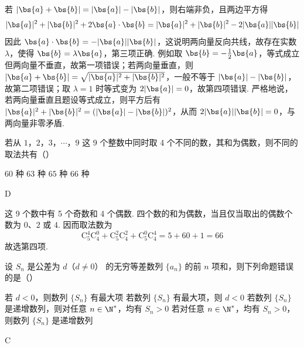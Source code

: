 \begin{solution}
若 \(|\bs{a}+\bs{b}|=|\bs{a}|-|\bs{b}|\)，则右端非负，且两边平方得
\[
|\bs{a}|^2+|\bs{b}|^2+2\bs{a}\cdot\bs{b}
=|\bs{a}|^2+|\bs{b}|^2-2|\bs{a}||\bs{b}|
\]
因此 \(\bs{a}\cdot\bs{b}=-|\bs{a}||\bs{b}|\)，这说明两向量反向共线，故存在实数 \(\lambda\)，使得 \(\bs{b}=\lambda\bs{a}\)，第三项正确. 例如取 \(\bs{b}=-\frac12\bs{a}\)，等式成立但两向量不垂直，故第一项错误；若两向量垂直，则 \(|\bs{a}+\bs{b}|=\sqrt{|\bs{a}|^2+|\bs{b}|^2}\)，一般不等于 \(|\bs{a}|-|\bs{b}|\)，故第二项错误；取 \(\lambda=1\) 时等式变为 \(2|\bs{a}|=0\)，故第四项错误.
严格地说，若两向量垂直且题设等式成立，则平方后有 \(|\bs{a}|^2+|\bs{b}|^2=(|\bs{a}|-|\bs{b}|)^2\)，从而 \(2|\bs{a}||\bs{b}|=0\)，与两向量非零矛盾.
\end{solution}

\begin{problem}
若从 \(1\)，\(2\)，\(3\)，\(\cdots\)，\(9\) 这 9 个整数中同时取 4 个不同的数，其和为偶数，则不同的取法共有（\quad）

\choices
    {\(60\text{ 种}\)}
    {\(63\text{ 种}\)}
    {\(65\text{ 种}\)}
    {\(66\text{ 种}\)}
\end{problem}

\begin{answer}
D
\end{answer}

\begin{solution}
这 9 个数中有 5 个奇数和 4 个偶数. 四个数的和为偶数，当且仅当取出的偶数个数为 \(0\)、\(2\) 或 \(4\). 因而取法数为
\[
\mathrm C_5^4\mathrm C_4^0+\mathrm C_5^2\mathrm C_4^2+\mathrm C_5^0\mathrm C_4^4
=5+60+1=66
\]
故选第四项.
\end{solution}

\begin{problem}
设 \(S_{n}\) 是公差为 \(d\)（\(d \neq 0\)） 的无穷等差数列 \(\{a_{n}\}\) 的前 \(n\) 项和，则下列命题错误的是（\quad）

\choices
    {若 \(d < 0\)，则数列 \(\{S_{n}\}\) 有最大项}
    {若数列 \(\{S_{n}\}\) 有最大项，则 \(d < 0\)}
    {若数列 \(\{S_{n}\}\) 是递增数列，则对任意 \(n \in \N^{*}\)，均有 \(S_{n} > 0\)}
    {若对任意 \(n \in \N^{*}\)，均有 \(S_n > 0\)，则数列 \(\{S_n\}\) 是递增数列}
\end{problem}

\begin{answer}
C
\end{answer}


